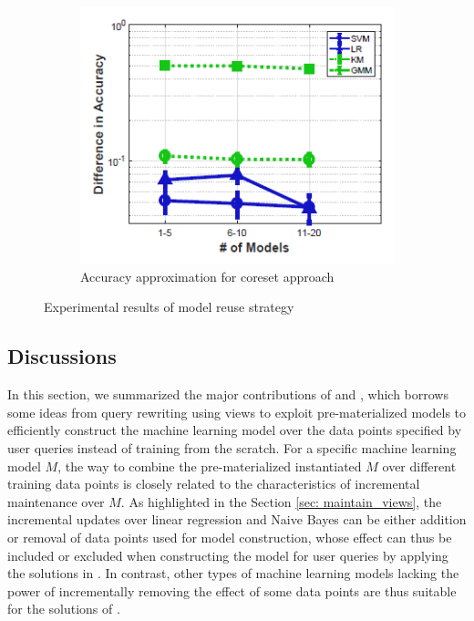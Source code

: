 \begin{figure}[h]
\begin{subfigure}{0.2\textwidth}
        \includegraphics[height = 1.2\textwidth, width=1.2\textwidth]{Figures/model_reuse_coreset_accuracy.png}
    \caption{Accuracy approximation for coreset approach}
    \label{fig:model_reuse4}
    \end{subfigure}
    \caption{Experimental results of model reuse strategy}
    \label{fig:model_reuse}
\end{figure}


\subsection{Discussions}
In this section, we summarized the major contributions of \cite{gupta2015processing} and \cite{hasani2018efficient}, which borrows some ideas from query rewriting using views to exploit pre-materialized models to efficiently construct the machine learning model over the data points specified by user queries instead of training from the scratch. For a specific machine learning model $M$, the way to combine the pre-materialized instantiated $M$ over different training data points is closely related to the characteristics of incremental maintenance over $M$. As highlighted in the Section \ref{sec: maintain_views}, the incremental updates over linear regression and Naive Bayes can be either addition or removal of data points used for model construction, whose effect can thus be included or excluded when constructing the model for user queries by applying the solutions in \cite{gupta2015processing}. In contrast, other types of machine learning models lacking the power of incrementally removing the effect of some data points are thus suitable for the solutions of \cite{hasani2018efficient}.

